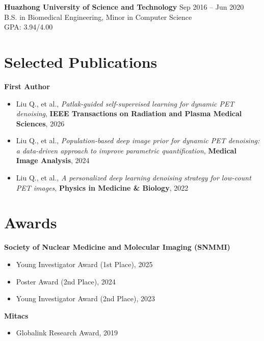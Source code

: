 \textbf{Huazhong University of Science and Technology} \hfill Sep 2016 -- Jun 2020 \\
B.S. in Biomedical Engineering, Minor in Computer Science \\
GPA: 3.94/4.00

\section{Selected Publications}
\textbf{First Author}
\begin{itemize}[leftmargin=*]
\item Liu Q., et al., \textit{Patlak-guided self-supervised learning for dynamic PET denoising}, \textbf{IEEE Transactions on Radiation and Plasma Medical Sciences}, 2026
\item Liu Q., et al., \textit{Population-based deep image prior for dynamic PET denoising: a data-driven approach to improve parametric quantification}, \textbf{Medical Image Analysis}, 2024
\item Liu Q., et al., \textit{A personalized deep learning denoising strategy for low-count PET images}, \textbf{Physics in Medicine \& Biology}, 2022
\end{itemize}

\section{Awards}
\textbf{Society of Nuclear Medicine and Molecular Imaging (SNMMI)}
\begin{itemize}[leftmargin=*]
\item Young Investigator Award (1st Place), 2025
\item Poster Award (2nd Place), 2024
\item Young Investigator Award (2nd Place), 2023
\end{itemize}

\textbf{Mitacs}
\begin{itemize}[leftmargin=*]
\item Globalink Research Award, 2019
\end{itemize}